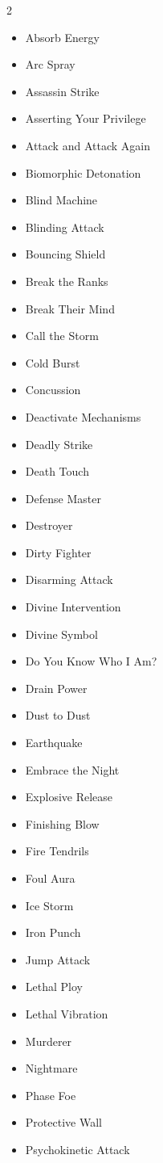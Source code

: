 \begin{multicols}{2}
\begin{itemize}
\item Absorb Energy
\item Arc Spray
\item Assassin Strike
\item Asserting Your Privilege
\item Attack and Attack Again
\item Biomorphic Detonation
\item Blind Machine
\item Blinding Attack
\item Bouncing Shield
\item Break the Ranks
\item Break Their Mind
\item Call the Storm
\item Cold Burst
\item Concussion
\item Deactivate Mechanisms
\item Deadly Strike
\item Death Touch
\item Defense Master
\item Destroyer
\item Dirty Fighter
\item Disarming Attack
\item Divine Intervention
\item Divine Symbol
\item Do You Know Who I Am?
\item Drain Power
\item Dust to Dust
\item Earthquake
\item Embrace the Night
\item Explosive Release
\item Finishing Blow
\item Fire Tendrils
\item Foul Aura
\item Ice Storm
\item Iron Punch
\item Jump Attack
\item Lethal Ploy
\item Lethal Vibration
\item Murderer
\item Nightmare
\item Phase Foe
\item Protective Wall
\item Psychokinetic Attack

\end{itemize}
\end{multicols}
